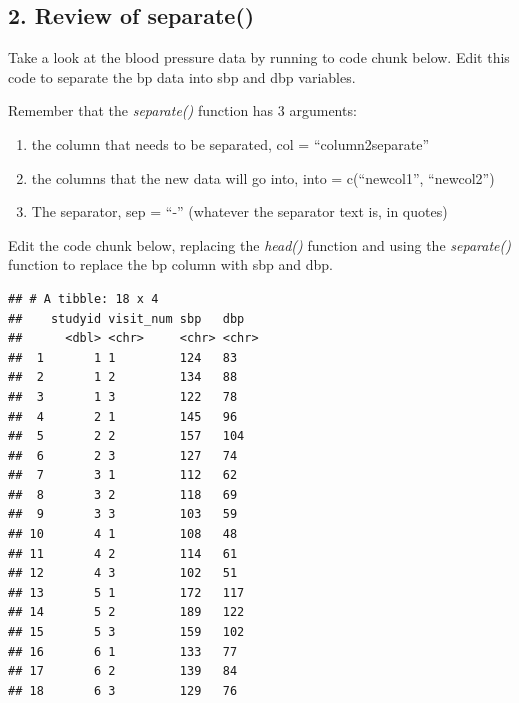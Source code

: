 \documentclass[
]{book}
\newenvironment{Shaded}{\begin{snugshade}}{\end{snugshade}}
\newcommand{\DataTypeTok}[1]{\textcolor[rgb]{0.13,0.29,0.53}{#1}}
\newcommand{\KeywordTok}[1]{\textcolor[rgb]{0.13,0.29,0.53}{\textbf{#1}}}
\newcommand{\NormalTok}[1]{#1}
\newcommand{\OperatorTok}[1]{\textcolor[rgb]{0.81,0.36,0.00}{\textbf{#1}}}
\newcommand{\StringTok}[1]{\textcolor[rgb]{0.31,0.60,0.02}{#1}}
\providecommand{\tightlist}{%
  \setlength{\itemsep}{0pt}\setlength{\parskip}{0pt}}
\begin{document}
\hypertarget{review-of-separate}{%
\subsection{2. Review of separate()}\label{review-of-separate}}

Take a look at the blood pressure data by running to code chunk below. Edit this code to separate the bp data into sbp and dbp variables.

Remember that the \emph{separate()} function has 3 arguments:

\begin{enumerate}
\def\labelenumi{\arabic{enumi}.}
\tightlist
\item
  the column that needs to be separated, col = ``column2separate''
\item
  the columns that the new data will go into, into = c(``newcol1'', ``newcol2'')
\item
  The separator, sep = ``-'' (whatever the separator text is, in quotes) 
\end{enumerate}

Edit the code chunk below, replacing the \emph{head()} function and using the \emph{separate()} function to replace the bp column with sbp and dbp.

\begin{Shaded}
\end{Shaded}

\begin{verbatim}
## # A tibble: 18 x 4
##    studyid visit_num sbp   dbp  
##      <dbl> <chr>     <chr> <chr>
##  1       1 1         124   83   
##  2       1 2         134   88   
##  3       1 3         122   78   
##  4       2 1         145   96   
##  5       2 2         157   104  
##  6       2 3         127   74   
##  7       3 1         112   62   
##  8       3 2         118   69   
##  9       3 3         103   59   
## 10       4 1         108   48   
## 11       4 2         114   61   
## 12       4 3         102   51   
## 13       5 1         172   117  
## 14       5 2         189   122  
## 15       5 3         159   102  
## 16       6 1         133   77   
## 17       6 2         139   84   
## 18       6 3         129   76
\end{verbatim}
\end{document}
